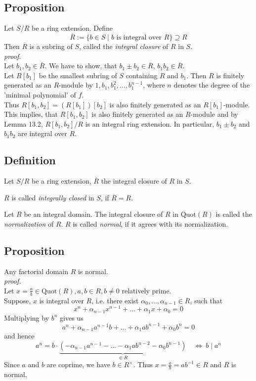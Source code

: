 \documentclass[12pt]{book}
\begin{document}
\begin{spacing}{1.3}
\subsection{Proposition} %
Let $S/R$ be a ring extension. Define
$$\overline{R}:=\{b \in S \mid b \textrm{ is integral over }R\} \supseteq R$$
Then $\overline{R}$ is a subring of $S$, called the \textit{integral closure} of $R$ in $S$.
\pagebreak\\
\textit{proof.}\\
Let $b_1, b_2 \in \overline{R}$. We have to show, that $b_1 \pm b_2 \in \overline{R}$, $b_1b_2 \in \overline{R}$.\\
Let $R[b_1]$ be the smallest subring of $S$ containing $R$ and $b_1$. Then $R$ is finitely generated as an $R$-module by $1,b_1, b_1^2, \ldots, b_1^{n-1}$, where $n$ denotes the degree of the 'minimal polynomial' of $f$.\\
Thus  $R[b_1, b_2]=\left(R[b_1]\right)[b_2]$ is also finitely generated as an $R[b_1]$-module. This implies, that $R[b_1,b_2]$ is also finitely generated as an $R$-module and by Lemma 13.2, $R[b_1,b_2]/R$ is an integral ring extension. In particular, $b_1 \pm b_2$ and $b_1b_2$ are integral over $R$.

\subsection{Definition} %
Let $S/R$ be a ring extension, $\overline{R}$ the integral closure of $R$ in $S$.
\begin{compactenum}
\item $R$ is called \textit{integrally closed} in $S$, if $\overline{R}=R$.
\item Let $R$ be an integral domain. The integral closure of $R$ in $\textrm{Quot}(R)$ is called the \textit{normalization} of $R$. $R$ is called \textit{normal}, if it agrees with its normalization.
\end{compactenum}

\subsection{Proposition} %
Any factorial domain $R$ is normal.\\
\textit{proof.}\\
Let $x=\frac{a}{b} \in \textrm{Quot}(R), a,b \in R, b \neq 0$ relatively prime.\\
Suppose, $x$ is integral over $R$, i.e. there exist $\alpha_0, \ldots, \alpha_{n-1} \in R$, such that 
$$x^n+ \alpha_{n-1}x^{n-1}+ \ldots + \alpha_1 x+\alpha_0=0$$
Multiplying by $b^n$ gives us
$$a^n+\alpha_{n-1}a^{n-1}b + \ldots + \alpha_1 a b^{n-1}+ \alpha_0 b^n =0$$
and hence
$$a^n= b \cdot \underbrace{\left(-\alpha_{n-1}a^{n-1}- \ldots - \alpha_1 a b^{n-2} - \alpha_0 b^{n-1}\right)}_{\in R} \quad \Longleftrightarrow\ b \mid a^n$$
Since $a$ and $b$ are coprime, we have $b \in R^{\times}$. Thus $x = \frac{a}{b}=ab^{-1} \in R$ and $R$ is normal.


\end{spacing}
\end{document}

